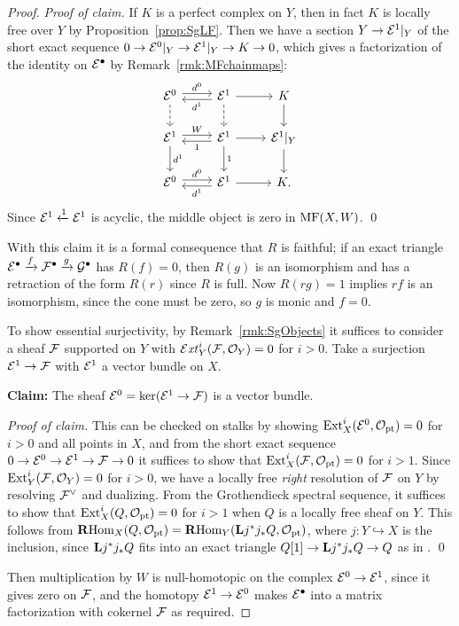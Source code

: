 \begin{proof}
    \textit{Proof of claim.} If $K$ is a perfect complex on $Y$, then in fact
    $K$ is locally free over $Y$ by Proposition~\ref{prop:SgLF}. Then we have a
    section $Y\to\mathcal{E}^1|_Y$ of the short exact sequence
    $0\to\mathcal{E}^0|_Y\to\mathcal{E}^1|_Y\to K\to0$, which gives a factorization of the
    identity on $\mathcal{E}^\bullet$ by Remark~\ref{rmk:MFchainmaps}:
    \begin{equation*}
        \begin{tikzcd}
            \calE^0 \ar[shift left]{r}{d^0} \ar[d,dashed] &
            \calE^1 \ar[shift left]{l}{d^1} \ar[d,dashed] \ar[r] &
            K \ar[d] \\
            \calE^1 \ar[shift left]{r}{W} \ar[d,"d^1"] &
            \calE^1 \ar[shift left]{l}{1} \ar[d,"1"] \ar[r] &
            \calE^1|_Y \ar[d] \\
            \calE^0 \ar[shift left]{r}{d^0} &
            \calE^1 \ar[shift left]{l}{d^1} \ar[r] &
            K.
        \end{tikzcd}
    \end{equation*}
    Since $\mathcal{E}^1\xleftarrow{1}\mathcal{E}^1$ is acyclic, the middle object is zero
    in $\operatorname{MF}(X,W)$. \qed

    With this claim it is a formal consequence that $R$ is faithful; if an exact
    triangle
    $\mathcal{E}^\bullet\xrightarrow{f}\mathcal{F}^\bullet\xrightarrow{g}\mathcal{G}^\bullet$ has
    $R(f)=0$, then $R(g)$ is an isomorphism and has a retraction of the form
    $R(r)$ since $R$ is full. Now $R(rg)=1$ implies $rf$ is an isomorphism,
    since the cone must be zero, so $g$ is monic and $f=0$.

    To show essential surjectivity, by Remark~\ref{rmk:SgObjects} it suffices to
    consider a sheaf $\mathcal{F}$ supported on $Y$ with $\operatorname{\mathcal{E}\mathit{xt}}^i_Y(\mathcal{F},\mathcal{O}_Y)=0$ for
    $i>0$. Take a surjection $\mathcal{E}^1\to\mathcal{F}$ with $\mathcal{E}^1$ a vector bundle on
    $X$.

    \textbf{Claim:} The sheaf $\mathcal{E}^0=\ker(\mathcal{E}^1\to\mathcal{F})$ is a vector
    bundle.

    \textit{Proof of claim.} This can be checked on stalks by showing
    $\operatorname{Ext}^i_X(\mathcal{E}^0,\mathcal{O}_{\mathrm{pt}})=0$ for $i>0$ and all points in $X$, and from the
    short exact sequence $0\to\mathcal{E}^0\to\mathcal{E}^1\to\mathcal{F}\to0$ it suffices to show
    that $\operatorname{Ext}^i_X(\mathcal{F},\mathcal{O}_{\mathrm{pt}})=0$ for $i>1$. Since $\operatorname{Ext}^i_Y(\mathcal{F},\mathcal{O}_Y)=0$
    for $i>0$, we have a locally free \emph{right} resolution of $\mathcal{F}$ on $Y$
    by resolving $\mathcal{F}^\vee$ and dualizing. From the Grothendieck spectral
    sequence, it suffices to show that $\operatorname{Ext}^i_X(Q,\mathcal{O}_{\mathrm{pt}})=0$ for $i>1$ when $Q$
    is a locally free sheaf on $Y$. This follows from
    $\operatorname{\mathbf{R} Hom}_X(Q,\mathcal{O}_{\mathrm{pt}})=\operatorname{\mathbf{R} Hom}_Y(\mathbf{L} j^*j_*Q,\mathcal{O}_{\mathrm{pt}})$, where $j:Y\hookrightarrow X$
    is the inclusion, since $\mathbf{L} j^*j_*Q$ fits into an exact triangle
    $Q[1]\to\mathbf{L} j^*j_*Q\to Q$ as in \cite[Cor 11.4]{Huybrechts}. \qed

    Then multiplication by $W$ is null-homotopic on the complex
    $\mathcal{E}^0\to\mathcal{E}^1$, since it gives zero on $\mathcal{F}$, and the homotopy
    $\mathcal{E}^1\to\mathcal{E}^0$ makes $\mathcal{E}^\bullet$ into a matrix factorization with
    cokernel $\mathcal{F}$ as required.
\end{proof}

